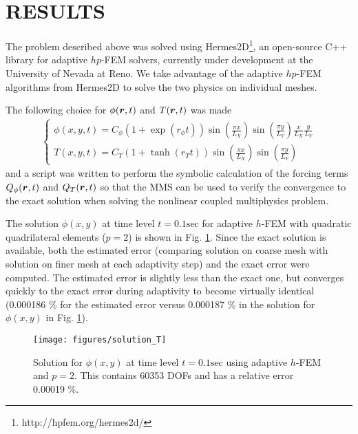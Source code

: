 \section*{RESULTS}
\vspace{-4mm}
The problem described above was solved using Hermes2D\footnote{http://hpfem.org/hermes2d/}, an open-source C++ library for adaptive $hp$-FEM solvers, currently under development at the University of Nevada at Reno.  We take advantage of the adaptive $hp$-FEM algorithms \cite{solin2010} from Hermes2D to solve the two physics on individual meshes.


The following choice for $\phi(\boldsymbol{r},t)$ and $T(\boldsymbol{r},t)$ was made
\begin{align}
  \left\{ \begin{array}{l}
      \phi(x,y,t) = C_\phi \left(1+\exp(r_\phi t)\right) \sin\left(\frac{\pi x}{L_X}\right) \sin\left(\frac{\pi y}{L_Y}\right) \frac{x}{L_X} \frac{y}{L_Y} \\
      T(x,y,t) = C_T \left(1+\tanh(r_T t)\right) \sin\left(\frac{\pi x}{L_X}\right) \sin\left(\frac{\pi y}{L_Y}\right)
  \end{array} \right.
\end{align}
and a script was written to perform the symbolic calculation of the forcing terms $Q_{\phi}(\boldsymbol{r},t)$ and $Q_T(\boldsymbol{r},t)$ so that the MMS can be used to verify the convergence to the exact solution when solving the nonlinear coupled multiphysics problem.

The solution $\phi(x,y)$ at time level $t=0.1 \mbox{sec}$ for adaptive $h$-FEM with quadratic quadrilateral elements ($p=2$) is shown in Fig. \ref{sol_temp}.  Since the exact solution is available, both the estimated error (comparing solution on coarse mesh with solution on finer mesh at each adaptivity step) and the exact error were computed.  The estimated error is slightly less than the exact one, but converges quickly to the exact error during adaptivity to become virtually identical (0.000186 \% for the estimated error versus 0.000187 \% in the solution for $\phi(x,y)$ in Fig. \ref{sol_temp}).
\begin{figure}
  \texttt{[image: figures/solution\_T]}
  \caption{Solution for $\phi(x,y)$ at time level $t=0.1 \mbox{sec}$ using adaptive $h$-FEM and $p=2$.  This contains 60353 DOFs and has a relative error 0.00019 \%.}
  \label{sol_temp}
\end{figure}

